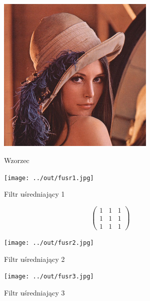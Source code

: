 \documentclass[a4paper,12pt]{article}
\begin{document}
\begin{figure}[h!]
\begin{minipage}[t]{7.5cm}
\begin{center}
\includegraphics[width=7.5cm,clip]{../../lena.jpg}
\caption{Wzorzec}
\end{center}
\end{minipage}
\hfill
\begin{minipage}[t]{7.5cm}
\begin{center}
\texttt{[image: ../out/fusr1.jpg]}
\caption{Filtr uśredniający 1}
\end{center}
\end{minipage}
\end{figure}

\begin{figure}[h!]
\begin{minipage}[t]{7.5cm}
\end{minipage}
\hfill
\begin{minipage}[t]{7.5cm}
\begin{center}
\[ \left( \begin{array}{ccc}
1 & 1 & 1 \\
1 & 1 & 1 \\
1 & 1 & 1 \end{array} \right)\] 
\end{center}
\end{minipage}
\end{figure}

\begin{figure}[h!]
\begin{minipage}[t]{7.5cm}
\begin{center}
\texttt{[image: ../out/fusr2.jpg]}
\caption{Filtr uśredniający 2}
\end{center}
\end{minipage}
\hfill
\begin{minipage}[t]{7.5cm}
\begin{center}
\texttt{[image: ../out/fusr3.jpg]}
\caption{Filtr uśredniający 3}
\end{center}
\end{minipage}
\end{figure}
\end{document}
